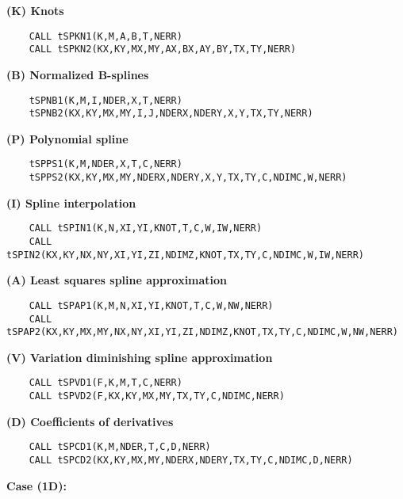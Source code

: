 {\bf (K) Knots}
\begin{verbatim}
    CALL tSPKN1(K,M,A,B,T,NERR)
    CALL tSPKN2(KX,KY,MX,MY,AX,BX,AY,BY,TX,TY,NERR)
\end{verbatim}
{\bf (B) Normalized B-splines}
\begin{verbatim}
    tSPNB1(K,M,I,NDER,X,T,NERR)
    tSPNB2(KX,KY,MX,MY,I,J,NDERX,NDERY,X,Y,TX,TY,NERR)
\end{verbatim}
{\bf (P) Polynomial spline}
\begin{verbatim}
    tSPPS1(K,M,NDER,X,T,C,NERR)
    tSPPS2(KX,KY,MX,MY,NDERX,NDERY,X,Y,TX,TY,C,NDIMC,W,NERR)
\end{verbatim}
{\bf (I) Spline interpolation}
\begin{verbatim}
    CALL tSPIN1(K,N,XI,YI,KNOT,T,C,W,IW,NERR)
    CALL tSPIN2(KX,KY,NX,NY,XI,YI,ZI,NDIMZ,KNOT,TX,TY,C,NDIMC,W,IW,NERR)
\end{verbatim}
{\bf (A) Least squares spline approximation}
\begin{verbatim}
    CALL tSPAP1(K,M,N,XI,YI,KNOT,T,C,W,NW,NERR)
    CALL tSPAP2(KX,KY,MX,MY,NX,NY,XI,YI,ZI,NDIMZ,KNOT,TX,TY,C,NDIMC,W,NW,NERR)
\end{verbatim}
{\bf (V) Variation diminishing spline approximation}
\begin{verbatim}
    CALL tSPVD1(F,K,M,T,C,NERR)
    CALL tSPVD2(F,KX,KY,MX,MY,TX,TY,C,NDIMC,NERR)
\end{verbatim}
{\bf (D) Coefficients of derivatives}
\begin{verbatim}
    CALL tSPCD1(K,M,NDER,T,C,D,NERR)
    CALL tSPCD2(KX,KY,MX,MY,NDERX,NDERY,TX,TY,C,NDIMC,D,NERR)
\end{verbatim}
\newpage
{\bf Case (1D):}
